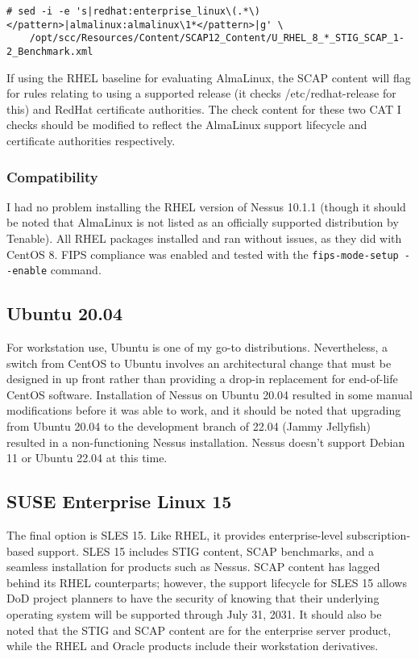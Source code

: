 \begin{lstlisting}[caption={Modify RHEL Benchmark for AlmaLinux},captionpos=b,style=BashStyle,basicstyle=\small,label={lst:20220321:alma},literate=*{-}{-}1,breaklines=true]
# sed -i -e 's|redhat:enterprise_linux\(.*\)</pattern>|almalinux:almalinux\1*</pattern>|g' \
	/opt/scc/Resources/Content/SCAP12_Content/U_RHEL_8_*_STIG_SCAP_1-2_Benchmark.xml
\end{lstlisting}

If using the RHEL baseline for evaluating AlmaLinux, the SCAP content will flag for rules relating to using a supported release (it checks /etc/redhat-release for this) and RedHat certificate authorities. The check content for these two CAT I checks should be modified to reflect the AlmaLinux support lifecycle and certificate authorities respectively.

\subsubsection{Compatibility}
I had no problem installing the RHEL version of Nessus 10.1.1 (though it should be noted that AlmaLinux is not listed as an officially supported distribution by Tenable). All RHEL packages installed and ran without issues, as they did with CentOS 8. FIPS compliance was enabled and tested with the \texttt{fips-mode-setup -\phantom{}-enable} command.

\subsection{Ubuntu 20.04}

For workstation use, Ubuntu is one of my go-to distributions. Nevertheless, a switch from CentOS to Ubuntu involves an architectural change that must be designed in up front rather than providing a drop-in replacement for end-of-life CentOS software. Installation of Nessus on Ubuntu 20.04 resulted in some manual modifications before it was able to work, and it should be noted that upgrading from Ubuntu 20.04 to the development branch of 22.04 (Jammy Jellyfish) resulted in a non-functioning Nessus installation. Nessus doesn't support Debian 11 or Ubuntu 22.04 at this time.

\subsection{SUSE Enterprise Linux 15}

The final option is SLES 15. Like RHEL, it provides enterprise-level subscription-based support. SLES 15 includes STIG content, SCAP benchmarks, and a seamless installation for products such as Nessus. SCAP content has lagged behind its RHEL counterparts; however, the support lifecycle for SLES 15 allows DoD project planners to have the security of knowing that their underlying operating system will be supported through July 31, 2031. It should also be noted that the STIG and SCAP content are for the enterprise server product, while the RHEL and Oracle products include their workstation derivatives.

